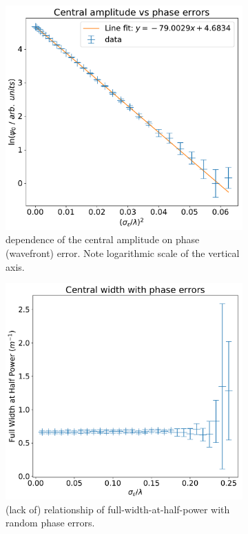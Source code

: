 \documentclass{article}
\begin{document}
\begin{figure}
    \centering
    \begin{subfigure}{0.45\textwidth}
        \centering
        \includegraphics[width=\textwidth]{pictures/rand/int}
        \caption{dependence of the central amplitude on phase (wavefront) error. Note logarithmic scale of the vertical axis.}\label{fig:rand:int}
    \end{subfigure}%
    \hfill
    \begin{subfigure}{0.45\textwidth}
        \centering
        \includegraphics[width=\textwidth]{pictures/rand/size}
        \caption{(lack of) relationship of full-width-at-half-power with random phase errors.}\label{fig:rand:size}
    \end{subfigure}
    \caption{}\label{fig:rand}
\end{figure}
\end{document}
